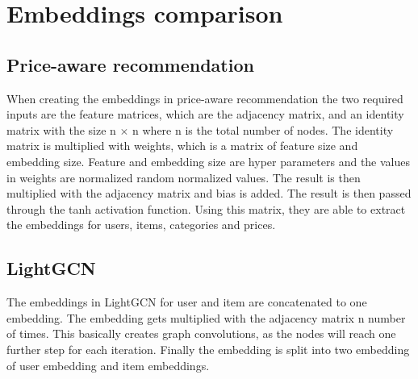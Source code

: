 \section{Embeddings comparison}
\subsection{Price-aware recommendation}
When creating the embeddings in price-aware recommendation the two required inputs are the feature matrices, which are the adjacency matrix, and an identity matrix with the size n  $\times$ n where n is the total number of nodes.
The identity matrix is multiplied with weights, which is a matrix of feature size and embedding size. 
Feature and embedding size are hyper parameters and the values in weights are normalized random normalized values.
The result is then multiplied with the adjacency matrix and bias is added.
The result is then passed through the tanh activation function.
Using this matrix, they are able to extract the embeddings for users, items, categories and prices.

\subsection{LightGCN}
The embeddings in LightGCN for user and item are concatenated to one embedding.
The embedding gets multiplied with the adjacency matrix n number of times.
This basically creates graph convolutions, as the nodes will reach one further step for each iteration.
Finally the embedding is split into two embedding of user embedding and item embeddings.
